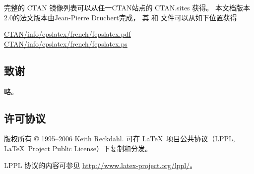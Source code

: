 完整的 CTAN 镜像列表可以从任一CTAN站点的 CTAN.sites 获得。
本文档版本2.0的法文版本由Jean-Pierre Drucbert完成，
其  和  文件可以从如下位置获得
\begin{center}
	\href{ftp://ctan.tug.org/tex-archive/info/epslatex/french/fepslatex.pdf}{CTAN/info/epslatex/french/fepslatex.pdf} \\
	\href{ftp://ctan.tug.org/tex-archive/info/epslatex/french/fepslatex.ps}{CTAN/info/epslatex/french/fepslatex.ps}
\end{center}

\subsection*{致谢}
略。

\subsection*{许可协议}
版权所有 \copyright{} 1995--2006  Keith Reckdahl.
可在 \LaTeX\ 项目公共协议（LPPL, \LaTeX\ Project Public License）下复制和分发。

LPPL 协议的内容可参见 \url{http://www.latex-project.org/lppl/}。

%
%

\clearpage
\endinput
